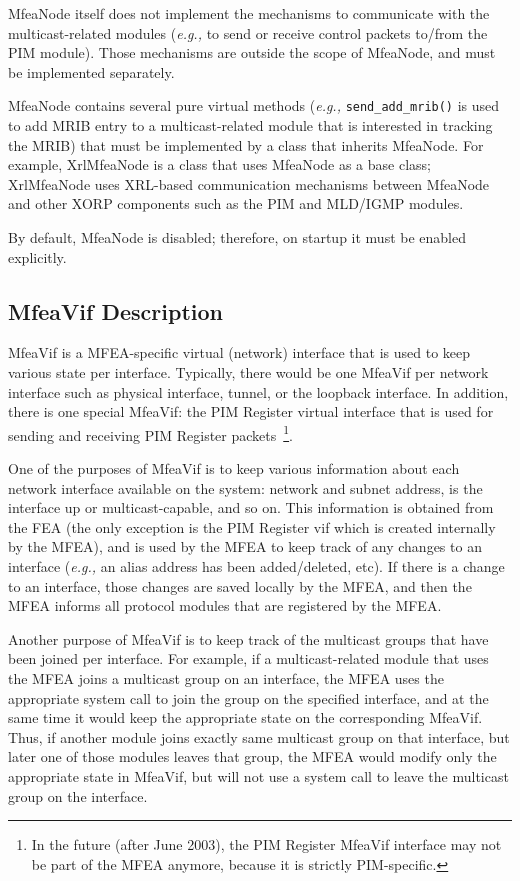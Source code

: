 \documentclass[11pt]{article}
\newcommand{\eg}{\emph{e.g.,}\xspace}
\begin{document}
MfeaNode itself does not implement the mechanisms to communicate with
the multicast-related modules (\eg to send or receive control packets
to/from the PIM module). Those mechanisms are outside the scope of
MfeaNode, and must be implemented separately.

MfeaNode contains several pure virtual methods (\eg
\verb=send_add_mrib()= is used to add MRIB entry to a
multicast-related module that is interested in tracking the MRIB) 
that must be implemented by a class that inherits MfeaNode.
For example, XrlMfeaNode is a class that uses MfeaNode as a base class;
XrlMfeaNode uses XRL-based communication mechanisms between MfeaNode
and other XORP components such as the PIM and MLD/IGMP modules.

By default, MfeaNode is disabled; therefore, on startup it must be
enabled explicitly.

\subsection{MfeaVif Description}

MfeaVif is a MFEA-specific virtual (network) interface that is used to keep
various state per interface. Typically, there would be one
MfeaVif per network interface such as physical
interface, tunnel, or the loopback interface. In addition, there is
one special MfeaVif: the PIM Register virtual
interface that is used for sending and receiving PIM Register
packets~\footnote{In the future (after June 2003), the PIM
Register MfeaVif interface may not be part of the MFEA anymore, because
it is strictly PIM-specific.}.

One of the purposes of MfeaVif is to keep various information about each
network interface available on the system: network and subnet address,
is the interface up or multicast-capable, and so on. This information is
obtained from the FEA (the only exception is the PIM Register vif which
is created internally by the MFEA), and is used by the MFEA to keep
track of any changes to an interface (\eg an alias address has been
added/deleted, etc). If there is a change to an interface, those changes
are saved locally by the MFEA, and then the MFEA informs all protocol
modules that are registered by the MFEA.

Another purpose of MfeaVif is to keep track of the multicast groups that
have been joined per interface. For example, if a multicast-related
module that uses the MFEA joins a multicast group on an interface, the
MFEA uses the appropriate system call to join the group on the
specified interface, and at the same time it would keep the appropriate
state on the corresponding MfeaVif. Thus, if another module joins
exactly same multicast group on that interface, but later one of
those modules leaves that group, the MFEA would modify only the appropriate
state in MfeaVif, but will not use a system call to leave the multicast
group on the interface.
\end{document}
